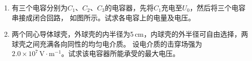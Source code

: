 \documentclass[UTF-8]{ctexart}
\begin{document}
\begin{enumerate}
    \item \label{itm:s4} 有三个电容分别为\(C_1\)、\(C_2\)、\(C_3\)的电容器，先将\(C_1\)充电至\(U_0\)，然后将三个电容串接成闭合回路，
        如图所示。试求各电容上的电量及电压。

    \item \label{itm:s5} 两个同心导体球壳，外球壳的内半径为5\,cm，内球壳的外半径可自由选择，两球壳之间充满各向同性的均匀电介质。
        设电介质的击穿场强为\(2.0\times 10^7\,\mathrm{V\cdot m^{-1}}\)。试求该电容器所能承受的最大电压。
\end{enumerate}
\end{document}
